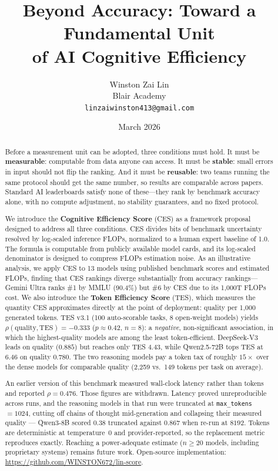 \documentclass[12pt]{article}
\title{\textbf{Beyond Accuracy: Toward a Fundamental Unit\\
of AI Cognitive Efficiency}}
\author{
    Winston Zai Lin \\
    \small Blair Academy \\
    \small \texttt{linzaiwinston413@gmail.com}
}
\date{March 2026}
\begin{document}
\maketitle

\begin{abstract}
Before a measurement unit can be adopted, three conditions must hold. It must be
\textbf{measurable}: computable from data anyone can access. It must be \textbf{stable}:
small errors in input should not flip the ranking. And it must be \textbf{reusable}: two
teams running the same protocol should get the same number, so results are comparable
across papers. Standard AI leaderboards satisfy none of these---they rank by benchmark
accuracy alone, with no compute adjustment, no stability guarantees, and no fixed protocol.

We introduce the \textbf{Cognitive Efficiency Score} (CES) as a framework proposal
designed to address all three conditions. CES divides bits of benchmark uncertainty
resolved by log-scaled inference FLOPs, normalized to a human expert baseline of 1.0. The
formula is computable from publicly available model cards, and its log-scaled denominator
is designed to compress FLOPs estimation noise. As an illustrative analysis, we apply CES
to 13 models using published benchmark scores and estimated FLOPs, finding that CES
rankings diverge substantially from accuracy rankings---Gemini Ultra ranks \#1 by MMLU
(90.4\%) but \#6 by CES due to its 1{,}000T FLOPs cost. We also introduce the \textbf{Token
Efficiency Score} (TES), which measures the quantity CES approximates directly at the
point of deployment: quality per 1{,}000 generated tokens. TES v3.1 (100 auto-scorable
tasks, 8 open-weight models) yields $\rho(\mathrm{quality}, \mathrm{TES}) = -0.333$
($p \approx 0.42$, $n = 8$): a \emph{negative}, non-significant association, in which the
highest-quality models are among the least token-efficient. DeepSeek-V3 leads on quality
($0.885$) but reaches only TES $4.43$, while Qwen2.5-72B tops TES at $6.46$ on quality
$0.780$. The two reasoning models pay a token tax of roughly $15\times$ over the dense
models for comparable quality (2{,}259 vs.\ 149 tokens per task on average).

An earlier version of this benchmark measured wall-clock latency rather than tokens and
reported $\rho = 0.476$. Those figures are withdrawn. Latency proved unreproducible
across runs, and the reasoning models in that run were truncated at
\texttt{max\_tokens}~$=1024$, cutting off chains of thought mid-generation and collapsing
their measured quality --- Qwen3-8B scored $0.38$ truncated against $0.867$ when re-run
at $8192$. Tokens are deterministic at temperature~0 and provider-reported, so the
replacement metric reproduces exactly. Reaching a power-adequate estimate ($n \geq 20$ models, including proprietary
systems) remains future work. Open-source implementation:
\url{https://github.com/WINSTON672/lin-score}.
\end{abstract}
\end{document}
